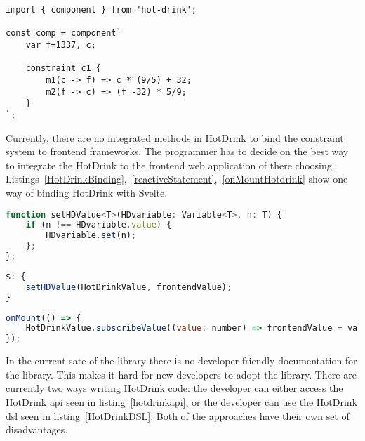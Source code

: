 \begin{lstlisting}[caption={Example of the HotDrink \gls{dsl}},label=HotDrinkDSL, language=hotdrink]
import { component } from 'hot-drink';

const comp = component`
    var f=1337, c;

    constraint c1 {
        m1(c -> f) => c * (9/5) + 32;
        m2(f -> c) => (f -32) * 5/9;
    }
`;
\end{lstlisting}

Currently, there are no integrated methods in HotDrink to bind the constraint system to frontend frameworks. The programmer has to decide on the best way to integrate the HotDrink to the frontend web application of there choosing. Listings~\ref{HotDrinkBinding},~\ref{reactiveStatement},~\ref{onMountHotdrink} show one way of binding HotDrink with Svelte.

\begin{lstlisting}[caption={Function for binding HotDrink and Svelte variable},label=HotDrinkBinding, language=javascript]
function setHDValue<T>(HDvariable: Variable<T>, n: T) {
    if (n !== HDvariable.value) { 
        HDvariable.set(n);
    };
};
\end{lstlisting}

\begin{lstlisting}[caption={Using the reactive statement, in Svelte~\cite{sveltedocs}, to update HotDrink corresopnding value, and trigger HotDrink to enforce the constraint system},label=reactiveStatement, language=javascript]
$: {
    setHDValue(HotDrinkValue, frontendValue);
}
\end{lstlisting}

\begin{lstlisting}[caption={Using the onMount callback, in Svelte~\cite{sveltedocs}, to update the frontend value that correspont to the same value in HotDrink, when the HotDrink value changes.},label=onMountHotdrink, language=javascript]
onMount(() => {
    HotDrinkValue.subscribeValue((value: number) => frontendValue = value);
});
\end{lstlisting}

In the current sate of the library there is no developer-friendly documentation for the library. This makes it hard for new developers to adopt the library. There are currently two ways writing HotDrink code: the developer can either access the HotDrink \gls{api} seen in listing~\ref{hotdrinkapi}, or the developer can use the HotDrink \gls{dsl} seen in listing~\ref{HotDrinkDSL}. Both of the approaches have their own set of disadvantages. 

